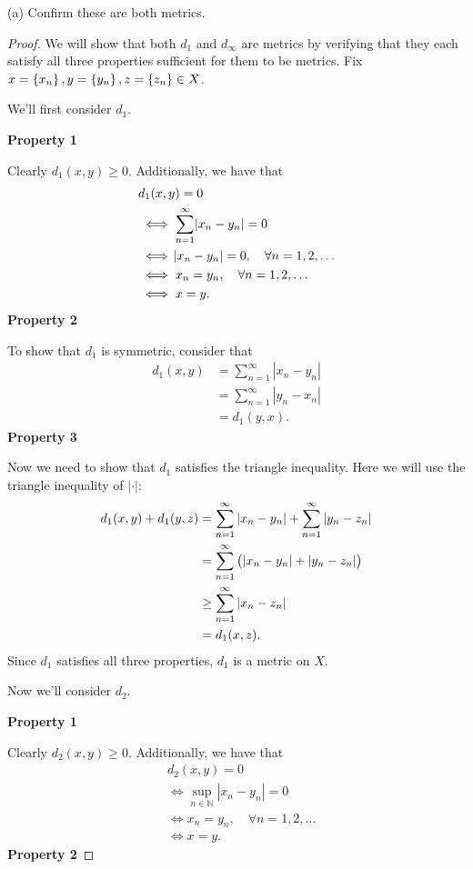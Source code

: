 \documentclass{article}
\newcommand{\N}{\mathbb{N}}
\begin{document}
(a) Confirm these are both metrics.

\begin{proof}

We will show that both $d_1$ and $d_\infty$ are metrics by verifying
that they each satisfy all three properties sufficient for them to be
metrics. Fix $x = \cbr{x_n}, y = \cbr{y_n}, z = \cbr{z_n} \in X$.

We'll first consider $d_1$.

\textbf{Property 1}

Clearly $d_1(x, y) \geq 0$. Additionally, we have that
%
\begin{align*}
    &d_1(x, y) = 0 \\
    &\iff \sum_{n = 1}^\infty \envert{x_n - y_n} = 0 \\
    &\iff \envert{x_n - y_n} = 0, \quad \forall n = 1, 2, \ldots \\
    &\iff x_n = y_n, \quad \forall n = 1, 2, \ldots \\
    &\iff x = y
    .
\end{align*}
%
\textbf{Property 2}

To show that $d_1$ is symmetric, consider that
%
\begin{align*}
    d_1(x, y)
        &= \sum_{n = 1}^\infty |x_n - y_n| \\
        &= \sum_{n = 1}^\infty |y_n - x_n| \\
        &= d_1(y, x)
        .
\end{align*}
%
\textbf{Property 3}

Now we need to show that $d_1$ satisfies the triangle inequality.
Here we will use the triangle inequality of $|\cdot|$:
%
\begin{align*}
    d_1(x, y) + d_1(y, z)
        &= \sum_{n = 1}^\infty |x_n - y_n| + \sum_{n = 1}^\infty |y_n - z_n| \\
        &= \sum_{n = 1}^\infty \del{|x_n - y_n| + |y_n - z_n|} \\
        &\geq \sum_{n = 1}^\infty |x_n - z_n| \\
        &= d_1(x, z)
        .
\end{align*}
%
Since $d_1$ satisfies all three properties, $d_1$ is a metric on $X$.

Now we'll consider $d_2$.

\textbf{Property 1}

Clearly $d_2(x, y) \geq 0$. Additionally, we have that
%
\begin{align*}
    &d_2(x, y) = 0 \\
    &\iff \sup_{n \in \N} |x_n - y_n| = 0 \\
    &\iff x_n = y_n, \quad \forall n = 1, 2, \ldots \\
    &\iff x = y
    .
\end{align*}
%
\textbf{Property 2}


\end{proof}
\end{document}
